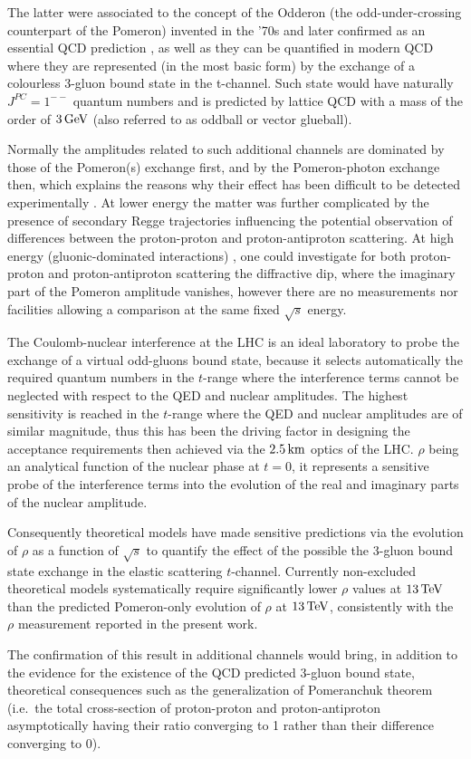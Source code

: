 The latter were associated to the concept of the Odderon (the odd-under-crossing counterpart of the Pomeron) invented in the '70s \cite{nicolescu-1973} and later confirmed as an essential QCD prediction \cite{lipatov-1986}, as well as they can be quantified in modern QCD \cite{durham-2015-review} where they are represented (in the most basic form) by the exchange of a colourless 3-gluon bound state in the t-channel. Such state would have naturally $J^{PC}=1^{--}$ quantum numbers and is predicted by lattice QCD with a mass of the order of $3\,{\rm GeV}$ (also referred to as oddball or vector glueball).

Normally the amplitudes related to such additional channels are dominated by those of the Pomeron(s) exchange first, and by the Pomeron-photon exchange then, which explains the reasons why their effect has been difficult to be detected experimentally%
. At lower energy%
the matter was further complicated by the presence of secondary Regge trajectories influencing the potential observation of differences between the proton-proton and proton-antiproton scattering. At high energy (gluonic-dominated interactions)%
, one could investigate for both proton-proton and proton-antiproton scattering the diffractive dip, where the imaginary part of the Pomeron amplitude vanishes, however there are no measurements nor facilities allowing a comparison at the same fixed $\sqrt s$ energy.

The Coulomb-nuclear interference at the LHC is an ideal laboratory to probe the exchange of a virtual odd-gluons bound state, because it selects automatically the required quantum numbers in the $t$-range where the interference terms cannot be neglected with respect to the QED and nuclear amplitudes. The highest sensitivity is reached in the $t$-range where the QED and nuclear amplitudes are of similar magnitude, thus this has been the driving factor in designing the acceptance requirements then achieved via the $2.5\,{\rm km}$ optics of the LHC. $\rho$ being an analytical function of the nuclear phase at $t=0$, it represents a sensitive probe of the interference terms into the evolution of the real and imaginary parts of the nuclear amplitude.

Consequently theoretical models have made sensitive predictions via the evolution of $\rho$ as a function of $\sqrt s$ to quantify the effect of the possible the 3-gluon bound state exchange in the elastic scattering $t$-channel. Currently non-excluded theoretical models systematically require significantly lower $\rho$ values at $13\,{\rm TeV}$ than the predicted Pomeron-only evolution of $\rho$ at $13\,{\rm TeV}$, consistently with the $\rho$ measurement reported in the present work.

The confirmation of this result in additional channels would bring, in addition to the evidence for the existence of the QCD predicted 3-gluon bound state, theoretical consequences such as the generalization of Pomeranchuk theorem (i.e.~the total cross-section of proton-proton and proton-antiproton asymptotically having their ratio converging to 1 rather than their difference converging to 0).
